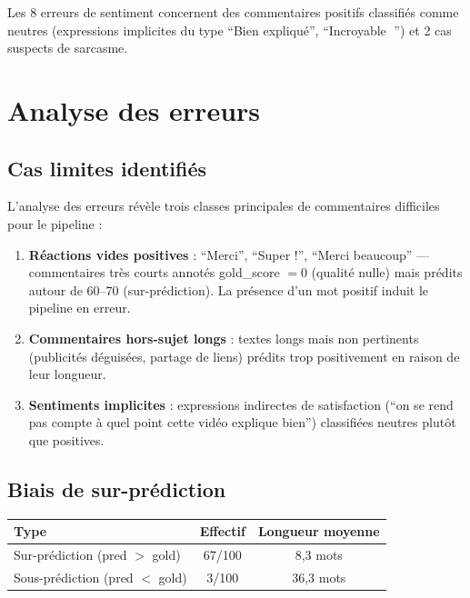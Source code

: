 \documentclass[12pt, a4paper]{article}
\begin{document}
Les 8 erreurs de sentiment concernent des commentaires positifs classifiés
comme neutres (expressions implicites du type ``Bien expliqué'',
``Incroyable 🎉'') et 2 cas suspects de sarcasme.

\section{Analyse des erreurs}

\subsection{Cas limites identifiés}

L'analyse des erreurs révèle trois classes principales de commentaires
difficiles pour le pipeline :

\begin{enumerate}
  \item \textbf{Réactions vides positives} : ``Merci'', ``Super !'', ``Merci
        beaucoup'' --- commentaires très courts annotés gold\_score $= 0$
        (qualité nulle) mais prédits autour de 60--70 (sur-prédiction).
        La présence d'un mot positif induit le pipeline en erreur.

  \item \textbf{Commentaires hors-sujet longs} : textes longs mais non pertinents
        (publicités déguisées, partage de liens) prédits trop positivement
        en raison de leur longueur.

  \item \textbf{Sentiments implicites} : expressions indirectes de satisfaction
        (``on se rend pas compte à quel point cette vidéo explique bien'')
        classifiées neutres plutôt que positives.
\end{enumerate}

\subsection{Biais de sur-prédiction}

\begin{center}
\begin{tabular}{lcc}
\toprule
Type & Effectif & Longueur moyenne \\
\midrule
Sur-prédiction (pred $>$ gold) & 67/100 & 8{,}3 mots \\
Sous-prédiction (pred $<$ gold) &  3/100 & 36{,}3 mots \\
\bottomrule
\end{tabular}
\end{center}
\end{document}
